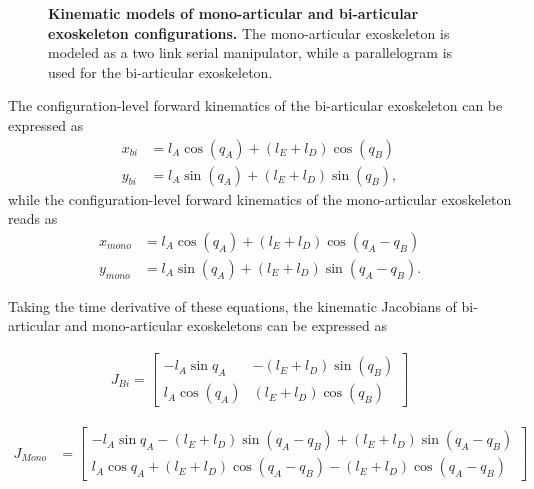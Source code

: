 \documentclass[10pt,letterpaper]{article}
\begin{document}
\begin{figure*}[h!]
	\centering
	\hfil
	\vspace{1mm}
	\caption{\small{\textbf{Kinematic models of mono-articular and bi-articular exoskeleton configurations.} The mono-articular exoskeleton is modeled as a two link serial manipulator, while a parallelogram is used for the bi-articular exoskeleton.}}
	\label{Fig_Exos_Kinematics_Model_Appendix}
\end{figure*}

The configuration-level forward kinematics of the bi-articular exoskeleton can be expressed as
%
\begin{align}\label{Eqn_Bi_Kin}
x_{bi} &= l_{A}\cos(q_{A}) + (l_{E} + l_ {D})\cos(q_{B})\\
y_{bi} &= l_{A}\sin(q_{A}) + (l_{E} + l_ {D})\sin(q_{B}),
\end{align}
%
\noindent while the configuration-level forward kinematics of the mono-articular exoskeleton reads as
%
\begin{align}\label{Eqn_Mono_Kin}
x_{mono} &= l_ {A}\cos(q_{A}) + (l_{E} + l_{D})\cos(q_{A} - q_{B})\\
y_{mono} &= l_ {A}\sin(q_{A}) + (l_{E} + l_{D})\sin(q_{A} - q_{B}).
\end{align}

Taking the time derivative of these equations, the kinematic Jacobians of bi-articular and mono-articular exoskeletons can be expressed as

\begin{gather}\label{Eqn_Bi_Jacobian}
J_{Bi} =
\begin{bmatrix}
-l_{A}\sin{q_{A}}  & -(l_ {E} + l_ {D})\sin (q_ {B})\\
l_ {A}\cos (q_{A}) &  (l_ {E} + l_ {D})\cos (q_ {B})
\end{bmatrix}
\end{gather}

\begin{equation}\label{Eqn_Mono_Jacobian}
\begin{aligned}
J_{Mono}&=
\left[\begin{matrix}
-l_{A}\sin{q_{A}}- (l_ {E} + l_ {D})\sin (q_ {A} - q_ {B})+ (l_ {E} + l_ {D})\sin (q_ {A} - q_ {B})\\
l_{A}\cos{q_{A}} + (l_{E} + l_{D})\cos (q_{A} - q_ {B})- (l_ {E} + l_ {D})\cos (q_ {A} - q_ {B})
\end{matrix}\right]
\end{aligned}
\end{equation}
\end{document}
